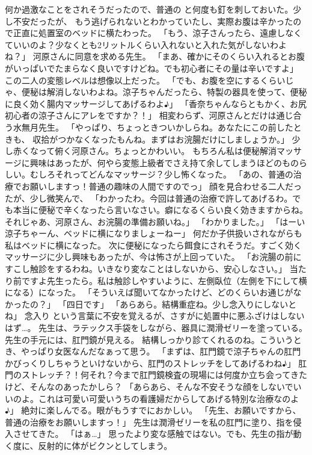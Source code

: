 何か過激なことをされそうだったので、普通の と何度も釘を刺しておいた。少し不安だったが、
もう逃げられないとわかっていたし、実際お腹は辛かったので正直に処置室のベッドに横たわった。
「もう、涼子さんったら、遠慮しなくていいのよ？少なくとも2リットルくらい入れないと入れた気がしないわよね？」
河原さんに同意を求める先生。
「まあ、確かにそのくらい入れるとお腹がいっぱいでたまらなく良いですけどね。でも初心者にその量は辛いですよ」
この二人の変態レベルは想像以上だった。
「でも、お腹を空にするくらいじゃ、便秘は解消しないわよね。涼子ちゃんだったら、特製の器具を使って、便秘に良く効く腸内マッサージしてあげるわよ♪」
「香奈ちゃんならともかく、お尻初心者の涼子さんにアレをですか？！」
相変わらず、河原さんとだけは通じ合う水無月先生。
「やっぱり、ちょっときついかしらね。あなたにこの前したときも、
収拾がつかなくなったもんね。まずはお浣腸だけにしましょうか。」
少し赤くなって俯く河原さん。ちょっとかわいい。
もちろん私は便秘解消マッサージに興味はあったが、何やら変態上級者でさえ持て余してしまうほどのものらしい。むしろそれってどんなマッサージ？少し怖くなった。
「あの、普通の治療でお願いしますっ！普通の趣味の人間ですのでっ」
顔を見合わせる二人だったが、少し微笑んで、
「わかったわ。今回は普通の治療で許してあげるわ。でも本当に便秘で辛くなったら言いなさい。癖になるくらい良く効きますからね。それじゃあ、河原さん、お浣腸の準備お願いね。」
「わかりました。」
「はーい涼子ちゃーん、ベッドに横になりましょーねー」
何だか子供扱いされながらも私はベッドに横になった。
次に便秘になったら餌食にされそうだ。すごく効くマッサージに少し興味もあったが、今は怖さが上回っていた。
「お浣腸の前にすこし触診をするわね。いきなり変なことはしないから、安心しなさい。」
当たり前ですよ先生ったら。私は触診しやすいように、左側臥位（左側を下にして横になる）になった。
「そういえば聞いてなかったけど、どのくらいお通じがなかったの？」
「四日です」
「あらあら。結構重症ね。少し念入りにしないとね」
念入り という言葉に不安を覚えるが、さすがに処置中に悪ふざけはしないはず…。
先生は、ラテックス手袋をしながら、器具に潤滑ゼリーを塗っている。
先生の手元には、肛門鏡が見える。
結構しっかり診てくれるのね。こういうとき、やっぱり女医なんだなぁって思う。
「まずは、肛門鏡で涼子ちゃんの肛門かびっくりしちゃうといけないから、肛門のストレッチをしてあげるわね♪」
肛門のストレッチ？！何それ？今まで肛門鏡検査の現場には何度か立ち会ってきたけど、そんなのあったかしら？
「あらあら、そんな不安そうな顔をしないでいいのよ。これは可愛い可愛いうちの看護婦だからしてあげる特別な治療なのよ♪」
絶対に楽しんでる。眼がもうすでにおかしい。
「先生、お願いですから、普通の治療をお願いしますっ！」
先生は潤滑ゼリーを私の肛門に塗り、指を侵入させてきた。
「はぁ…」
思ったより変な感触ではない。でも、先生の指が動く度に、反射的に体がビクンとしてしまう。
